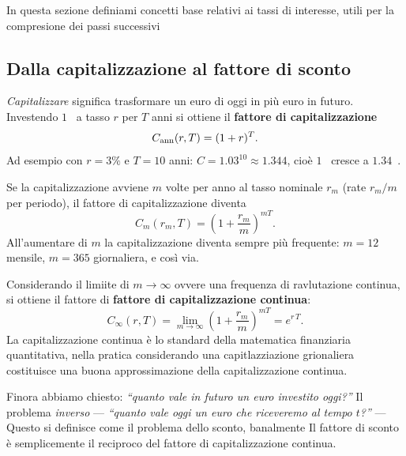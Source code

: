 \documentclass[11pt,a4paper]{article}
\theoremstyle{plain}
\theoremstyle{definition}
\theoremstyle{remark}
\begin{document}
In questa sezione definiami concetti base relativi ai tassi di interesse, utili per la compresione dei passi successivi

\subsection{Dalla capitalizzazione al fattore di sconto}

\emph{Capitalizzare} significa trasformare un euro di oggi in pi\`u euro in futuro.
Investendo $1$~\texteuro{} a tasso $r$ per $T$ anni si ottiene il
\textbf{fattore di capitalizzazione}
\[
  C_{\rm ann}(r,T) = (1+r)^T.
\]
Ad esempio con $r=3\%$ e $T=10$ anni: $C = 1.03^{10} \approx 1.344$, cio\`e $1$~\texteuro{}
cresce a $1.34$~\texteuro{}.

Se la capitalizzazione avviene $m$ volte per anno al tasso nominale $r_m$ (rate $r_m/m$
per periodo), il fattore di capitalizzazione diventa
\[
  C_m(r_m,T) = \left(1 + \frac{r_m}{m}\right)^{mT}.
\]
All'aumentare di $m$ la capitalizzazione diventa sempre pi\`u frequente: $m=12$ mensile,
$m=365$ giornaliera, e cos\`i via.

Considerando il limiite di ${m\to\infty}$ ovvere una frequenza di ravlutazione continua, si ottiene il fattore di
\textbf{fattore di capitalizzazione continua}:
\begin{equation}
  C_\infty(r,T) = \lim_{m\to\infty}\left(1+\frac{r_m}{m}\right)^{mT} = e^{r\,T}.
  \label{eq:cap-cont}
\end{equation}
La capitalizzazione continua \`e lo standard della matematica finanziaria quantitativa, nella pratica considerando una capitlazziazione grionaliera costituisce una buona approssimazione della capitalizzazione continua.

Finora abbiamo chiesto: \emph{``quanto vale in futuro un euro investito oggi?''} Il problema
\emph{inverso} --- \emph{``quanto vale oggi un euro che riceveremo al tempo $t$?''} --- Questo si definisce come 
il problema dello sconto, banalmente Il fattore di sconto \`e semplicemente il reciproco del fattore
di capitalizzazione continua.
\end{document}

